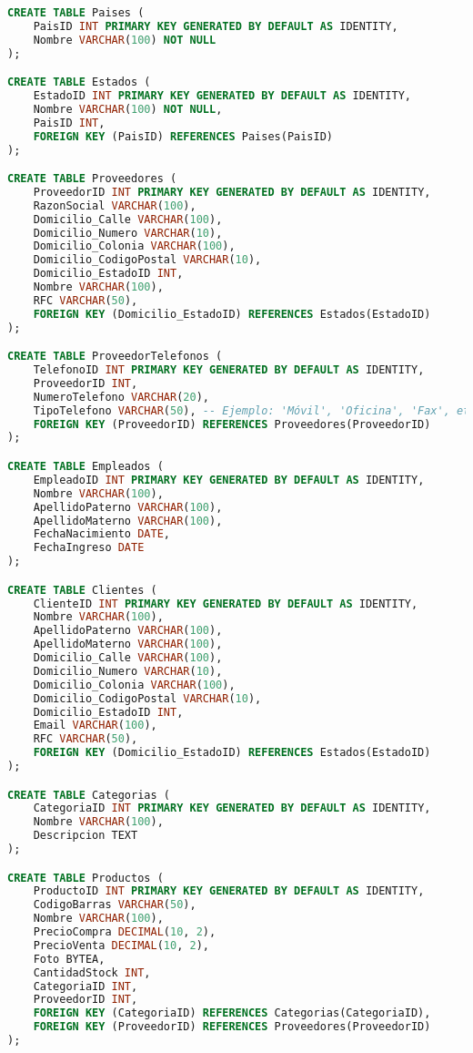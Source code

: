 \documentclass[10pt,openany]{book}
\begin{document}
\begin{lstlisting}[language=SQL]
CREATE TABLE Paises (
    PaisID INT PRIMARY KEY GENERATED BY DEFAULT AS IDENTITY,
    Nombre VARCHAR(100) NOT NULL
);

CREATE TABLE Estados (
    EstadoID INT PRIMARY KEY GENERATED BY DEFAULT AS IDENTITY,
    Nombre VARCHAR(100) NOT NULL,
    PaisID INT,
    FOREIGN KEY (PaisID) REFERENCES Paises(PaisID)
);

CREATE TABLE Proveedores (
    ProveedorID INT PRIMARY KEY GENERATED BY DEFAULT AS IDENTITY,
    RazonSocial VARCHAR(100),
    Domicilio_Calle VARCHAR(100),
    Domicilio_Numero VARCHAR(10),
    Domicilio_Colonia VARCHAR(100),
    Domicilio_CodigoPostal VARCHAR(10),
    Domicilio_EstadoID INT,
    Nombre VARCHAR(100),
    RFC VARCHAR(50),
    FOREIGN KEY (Domicilio_EstadoID) REFERENCES Estados(EstadoID)
);

CREATE TABLE ProveedorTelefonos (
    TelefonoID INT PRIMARY KEY GENERATED BY DEFAULT AS IDENTITY,
    ProveedorID INT,
    NumeroTelefono VARCHAR(20),
    TipoTelefono VARCHAR(50), -- Ejemplo: 'Móvil', 'Oficina', 'Fax', etc.
    FOREIGN KEY (ProveedorID) REFERENCES Proveedores(ProveedorID)
);

CREATE TABLE Empleados (
    EmpleadoID INT PRIMARY KEY GENERATED BY DEFAULT AS IDENTITY,
    Nombre VARCHAR(100),
    ApellidoPaterno VARCHAR(100),
    ApellidoMaterno VARCHAR(100),
    FechaNacimiento DATE,
    FechaIngreso DATE
);

CREATE TABLE Clientes (
    ClienteID INT PRIMARY KEY GENERATED BY DEFAULT AS IDENTITY,
    Nombre VARCHAR(100),
    ApellidoPaterno VARCHAR(100),
    ApellidoMaterno VARCHAR(100),
    Domicilio_Calle VARCHAR(100),
    Domicilio_Numero VARCHAR(10),
    Domicilio_Colonia VARCHAR(100),
    Domicilio_CodigoPostal VARCHAR(10),
    Domicilio_EstadoID INT,
    Email VARCHAR(100),
    RFC VARCHAR(50),
    FOREIGN KEY (Domicilio_EstadoID) REFERENCES Estados(EstadoID)
);

CREATE TABLE Categorias (
    CategoriaID INT PRIMARY KEY GENERATED BY DEFAULT AS IDENTITY,
    Nombre VARCHAR(100),
    Descripcion TEXT
);

CREATE TABLE Productos (
    ProductoID INT PRIMARY KEY GENERATED BY DEFAULT AS IDENTITY,
    CodigoBarras VARCHAR(50),
    Nombre VARCHAR(100),
    PrecioCompra DECIMAL(10, 2),
    PrecioVenta DECIMAL(10, 2),
    Foto BYTEA,
    CantidadStock INT,
    CategoriaID INT,
    ProveedorID INT,
    FOREIGN KEY (CategoriaID) REFERENCES Categorias(CategoriaID),
    FOREIGN KEY (ProveedorID) REFERENCES Proveedores(ProveedorID)
);


\end{lstlisting}
\end{document}
